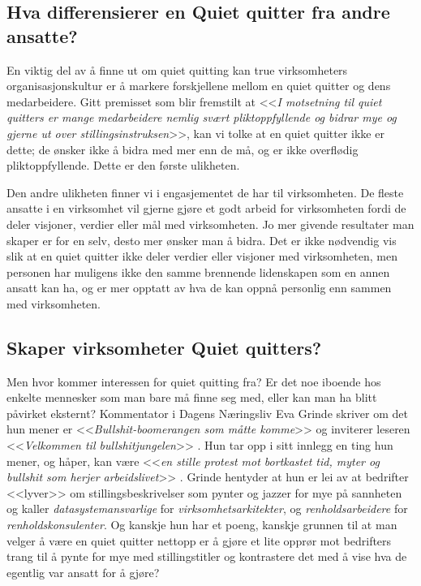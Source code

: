 \documentclass[a4paper, 12pt]{article}  %
\begin{document}
\subsection{Hva differensierer en Quiet quitter fra andre ansatte?}

En viktig del av å finne ut om quiet quitting kan true virksomheters organisasjonskultur er å markere forskjellene mellom en quiet quitter og dens medarbeidere.
Gitt premisset som blir fremstilt at <<\emph{I motsetning til quiet quitters er mange medarbeidere nemlig svært pliktoppfyllende og bidrar mye og gjerne ut over stillingsinstruksen}>>, kan vi tolke at en quiet quitter ikke er dette; de ønsker ikke å bidra med mer enn de må, og er ikke overflødig pliktoppfyllende.
Dette er den første ulikheten.

Den andre ulikheten finner vi i engasjementet de har til virksomheten. 
De fleste ansatte i en virksomhet vil gjerne gjøre et godt arbeid for virksomheten fordi de deler visjoner, verdier eller mål med virksomheten. 
Jo mer givende resultater man skaper er for en selv, desto mer ønsker man å bidra.
Det er ikke nødvendig vis slik at en quiet quitter ikke deler verdier eller visjoner med virksomheten, men personen har muligens ikke den samme brennende lidenskapen som en annen ansatt kan ha, og er mer opptatt av hva de kan oppnå personlig enn sammen med virksomheten.

\subsection{Skaper virksomheter Quiet quitters?}

Men hvor kommer interessen for quiet quitting fra?
Er det noe iboende hos enkelte mennesker som man bare må finne seg med, eller kan man ha blitt påvirket eksternt? 
Kommentator i Dagens Næringsliv Eva Grinde skriver om det hun mener er <<\emph{Bullshit-boomerangen som måtte komme}>> og inviterer leseren <<\emph{Velkommen til bullshitjungelen}>> \parencite{grinde22}.
Hun tar opp i sitt innlegg en ting hun mener, og håper, kan være <<\emph{en stille protest mot bortkastet tid, myter og bullshit som herjer arbeidslivet}>> \parencite{grinde22}.
Grinde hentyder at hun er lei av at bedrifter <<lyver>> om stillingsbeskrivelser som pynter og jazzer for mye på sannheten og kaller \emph{datasystemansvarlige} for \emph{virksomhetsarkitekter}, og \emph{renholdsarbeidere} for \emph{renholdskonsulenter}.
Og kanskje hun har et poeng, kanskje grunnen til at man velger å være en quiet quitter nettopp er å gjøre et lite opprør mot bedrifters trang til å pynte for mye med stillingstitler og kontrastere det med å vise hva de egentlig var ansatt for å gjøre?
\end{document}
